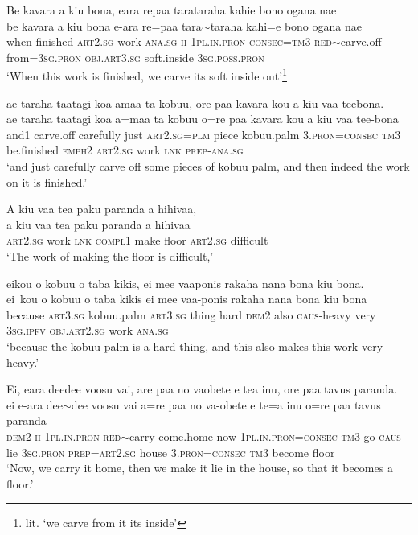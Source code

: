 \ea\label{ex:text15-26}
Be kavara a kiu bona, eara repaa tarataraha kahie bono ogana nae\\
\gll be	kavara	a	kiu	bona	e-ara	re=paa	tara{$\sim$}taraha	kahi=e	bono	ogana	nae\\
     when	finished	\textsc{art}2.\textsc{sg}	work	\textsc{ana}.\textsc{sg}	\textsc{h}-1\textsc{pl}.\textsc{in}.\textsc{pron}	\textsc{consec}=\textsc{tm}3	\textsc{red}{$\sim$}carve.off	from=3\textsc{sg}.\textsc{pron}	\textsc{obj}.\textsc{art}3.\textsc{sg}	soft.inside	3\textsc{sg}.\textsc{poss}.\textsc{pron}\\
\glt `When this work is finished, we carve its soft inside out'\footnote{lit. `we carve from it its inside'}
\z

\ea\label{ex:text15-27}
ae taraha taatagi koa amaa ta kobuu, ore paa kavara kou a kiu vaa teebona.\\
\gll ae	taraha	taatagi	koa	a=maa	ta	kobuu	o=re	paa	kavara	kou	a	kiu	vaa	tee-bona\\
     and1	carve.off	carefully	just	\textsc{art}2.\textsc{sg}=\textsc{plm}	piece	kobuu.palm	3.\textsc{pron}=\textsc{consec}	\textsc{tm}3	be.finished	\textsc{emph}2	\textsc{art}2.\textsc{sg}	work	\textsc{lnk}	\textsc{prep}-\textsc{ana}.\textsc{sg}\\
\glt `and just carefully carve off some pieces of kobuu palm, and then indeed the work on it is finished.'
\z

\ea\label{ex:text15-28}
A kiu vaa tea paku paranda a hihivaa,\\
\gll a	kiu	vaa	tea	paku	paranda	a	hihivaa\\
     \textsc{art}2.\textsc{sg}	work	\textsc{lnk}	\textsc{compl}1	make	floor	\textsc{art}2.\textsc{sg}	difficult\\
\glt `The work of making the floor is difficult,'
\z

\ea\label{ex:text15-29}
eikou o kobuu o taba kikis, ei mee vaaponis rakaha nana bona kiu bona.\\
\gll ei~kou	o	kobuu	o	taba	kikis	ei	mee	vaa-ponis	rakaha	nana	bona	kiu	bona\\
     because	\textsc{art}3.\textsc{sg}	kobuu.palm	\textsc{art}3.\textsc{sg}	thing	hard	\textsc{dem}2	also	\textsc{caus}-heavy	very	3\textsc{sg}.\textsc{ipfv}	\textsc{obj}.\textsc{art}2.\textsc{sg}	work	\textsc{ana}.\textsc{sg}\\
\glt `because the kobuu palm is a hard thing, and this also makes this work very heavy.'
\z

\ea\label{ex:text15-30}
Ei, eara deedee voosu vai, are paa no vaobete e tea inu, ore paa tavus paranda.\\
\gll ei	e-ara	dee{$\sim$}dee	voosu	vai	a=re	paa	no	va-obete	e	te=a	inu	o=re	paa	tavus	paranda\\
     \textsc{dem}2	\textsc{h}-1\textsc{pl}.\textsc{in}.\textsc{pron}	\textsc{red}{$\sim$}carry	come.home	now	1\textsc{pl}.\textsc{in}.\textsc{pron}=\textsc{consec}	\textsc{tm}3	go	\textsc{caus}-lie	3\textsc{sg}.\textsc{pron}	\textsc{prep}=\textsc{art}2.\textsc{sg}	house	3.\textsc{pron}=\textsc{consec}	\textsc{tm}3	become	floor\\
\glt `Now, we carry it home, then we make it lie in the house, so that it becomes a floor.'
\z
